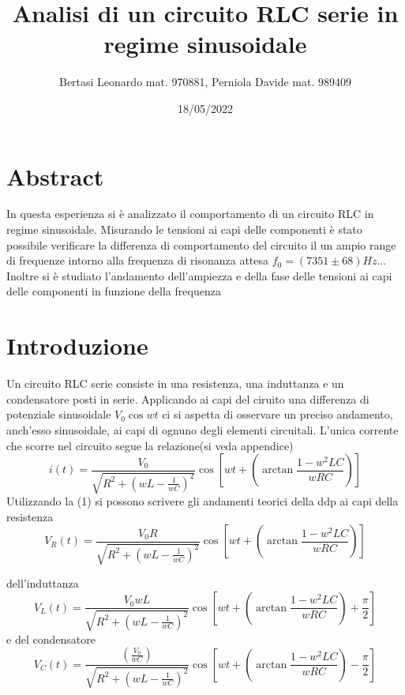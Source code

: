 \documentclass{article}
\title{Analisi di un circuito RLC serie in regime sinusoidale}
\date{18/05/2022}
\author{Bertasi Leonardo mat. 970881, Perniola Davide mat. 989409}
\begin{document}
\maketitle
\section{Abstract} 
In questa esperienza si è analizzato il comportamento di un circuito RLC in regime sinusoidale. Misurando le tensioni ai capi delle componenti è stato possibile
verificare la differenza di comportamento del circuito il un ampio range di frequenze intorno alla frequenza di risonanza attesa $f_0=(7351\pm68)Hz$...
Inoltre si è studiato l'andamento dell'ampiezza e della fase delle tensioni ai capi delle componenti in funzione della frequenza


\section{Introduzione} 
Un circuito RLC serie consiste in una resistenza, una induttanza e un condensatore posti in serie. Applicando ai capi del ciruito una differenza di potenziale sinusoidale $V_{0}\cos{wt} $ ci si aspetta di osservare un preciso andamento, anch'esso sinusoidale,
 ai capi di ognuno degli elementi circuitali. L'unica corrente che scorre nel circuito segue la relazione(si veda appendice) 
\begin{equation}
  i(t)=\frac{V_{0}}{\sqrt{R^2+(wL-\frac{1}{wC})^2}}\cos{[wt+(\arctan{\frac{1-w^2LC}{wRC}})]}
\end{equation}
Utilizzando la (1) si possono scrivere gli andamenti teorici della ddp ai capi della resistenza
\begin{equation}
 V_{R}(t)= \frac{V_{0}R}{\sqrt{R^2+(wL-\frac{1}{wC})^2}}\cos{[wt+(\arctan{\frac{1-w^2LC}{wRC}})]}
\end{equation}

dell'induttanza
\begin{equation}
  V_{L}(t)=\frac{V_{0}wL}{\sqrt{R^2+(wL-\frac{1}{wC})^2}}\cos{[wt+(\arctan{\frac{1-w^2LC}{wRC}})+\frac{\pi}{2}]}
\end{equation}
e del condensatore
\begin{equation}
  V_{C}(t)=\frac{(\frac{V_{0}}{wC})}{\sqrt{R^2+(wL-\frac{1}{wC})^2}}\cos{[wt+(\arctan{\frac{1-w^2LC}{wRC}})-\frac{\pi}{2}]}
\end{equation} 
\end{document}
